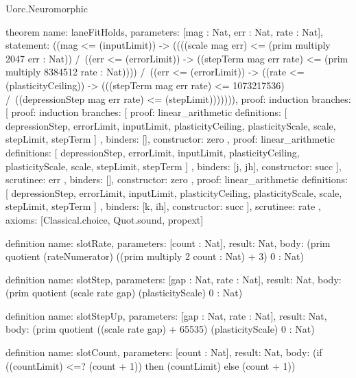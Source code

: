 \begin{lexlean}{Uorc.Neuromorphic}
\begin{semanticmodule}
theorem{
  name: laneFitHolds,
  parameters: [mag : Nat, err : Nat, rate : Nat],
  statement: ((mag <= (inputLimit)) -> ((((scale mag err) <= (prim multiply 2047 err : Nat)) /\ ((err <= (errorLimit)) -> ((stepTerm mag err rate) <= (prim multiply 8384512 rate : Nat)))) /\ ((err <= (errorLimit)) -> ((rate <= (plasticityCeiling)) -> (((stepTerm mag err rate) <= 1073217536) /\ ((depressionStep mag err rate) <= (stepLimit))))))),
  proof: induction{
    branches: [
      {
        proof: induction{
          branches: [
            {
              proof: linear_arithmetic{
                definitions: [
                  depressionStep,
                  errorLimit,
                  inputLimit,
                  plasticityCeiling,
                  plasticityScale,
                  scale,
                  stepLimit,
                  stepTerm
                ]
              },
              binders: [],
              constructor: zero
            },
            {
              proof: linear_arithmetic{
                definitions: [
                  depressionStep,
                  errorLimit,
                  inputLimit,
                  plasticityCeiling,
                  plasticityScale,
                  scale,
                  stepLimit,
                  stepTerm
                ]
              },
              binders: [j, jh],
              constructor: succ
            }
          ],
          scrutinee: err
        },
        binders: [],
        constructor: zero
      },
      {
        proof: linear_arithmetic{
          definitions: [
            depressionStep,
            errorLimit,
            inputLimit,
            plasticityCeiling,
            plasticityScale,
            scale,
            stepLimit,
            stepTerm
          ]
        },
        binders: [k, ih],
        constructor: succ
      }
    ],
    scrutinee: rate
  },
  axioms: [Classical.choice, Quot.sound, propext]
}

definition{
  name: slotRate,
  parameters: [count : Nat],
  result: Nat,
  body: (prim quotient (rateNumerator) ((prim multiply 2 count : Nat) + 3) 0 : Nat)
}

definition{
  name: slotStep,
  parameters: [gap : Nat, rate : Nat],
  result: Nat,
  body: (prim quotient (scale rate gap) (plasticityScale) 0 : Nat)
}

definition{
  name: slotStepUp,
  parameters: [gap : Nat, rate : Nat],
  result: Nat,
  body: (prim quotient ((scale rate gap) + 65535) (plasticityScale) 0 : Nat)
}

definition{
  name: slotCount,
  parameters: [count : Nat],
  result: Nat,
  body: (if ((countLimit) <=? (count + 1)) then (countLimit) else (count + 1))
}


\end{semanticmodule}
\end{lexlean}
